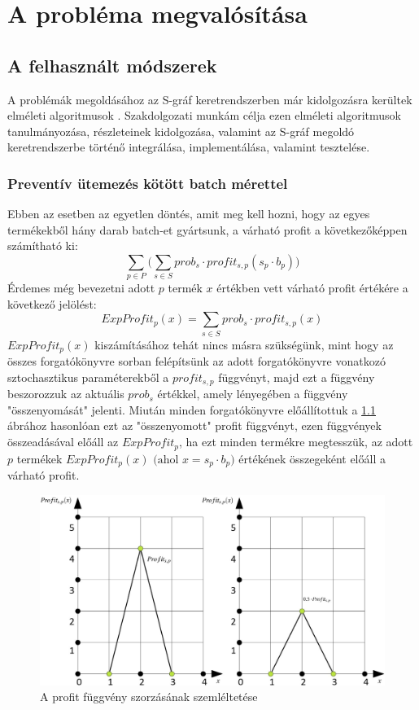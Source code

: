 \chapter{A probléma megvalósítása}
\section{A felhasznált módszerek} \label{math_modells}
A problémák megoldásához az S-gráf keretrendszerben már kidolgozásra kerültek elméleti algoritmusok \cite{phd_Hegyhati}. Szakdolgozati munkám célja ezen elméleti algoritmusok tanulmányozása, részleteinek kidolgozása, valamint az S-gráf megoldó keretrendszerbe történő integrálása, implementálása, valamint tesztelése.
\subsection{Preventív ütemezés kötött batch mérettel} \label{FixBatchSize}
Ebben az esetben az egyetlen döntés, amit meg kell hozni, hogy az egyes termékekből hány darab batch-et gyártsunk, a várható profit a következőképpen számítható ki:
$$\sum_{p \in P}\bigg (\sum_{s \in S} prob_s \cdot profit_{s,p} (s_p \cdot b_p)\bigg)$$
Érdemes még bevezetni adott $p$ termék $x$ értékben vett várható profit értékére a következő jelölést:
$$ExpProfit_p(x)=\sum_{s \in S}prob_s \cdot profit_{s,p}(x)$$
$ExpProfit_p(x)$ kiszámításához tehát nincs másra szükségünk, mint hogy az összes forgatókönyvre sorban felépítsünk az adott forgatókönyvre vonatkozó sztochasztikus paraméterekből a $profit_{s,p}$ függvényt, majd ezt a függvény beszorozzuk az aktuális $prob_s$ értékkel, amely lényegében a függvény "összenyomását" jelenti. Miután minden forgatókönyvre előállítottuk a \ref{profit_func_prob} ábrához hasonlóan ezt az "összenyomott" profit függvényt, ezen függvények összeadásával előáll az $ExpProfit_p$, ha ezt minden termékre megtesszük, az adott $p$ termékek $ExpProfit_p(x) \text{ (ahol }x=s_p \cdot b_p)$ értékének összegeként előáll a várható profit.
\begin{figure}[H]
\begin{center}
\includegraphics[scale=0.4]{profit_func_prob}
\caption{A profit függvény szorzásának szemléltetése}
\label{profit_func_prob}
\end{center}
\end{figure}
